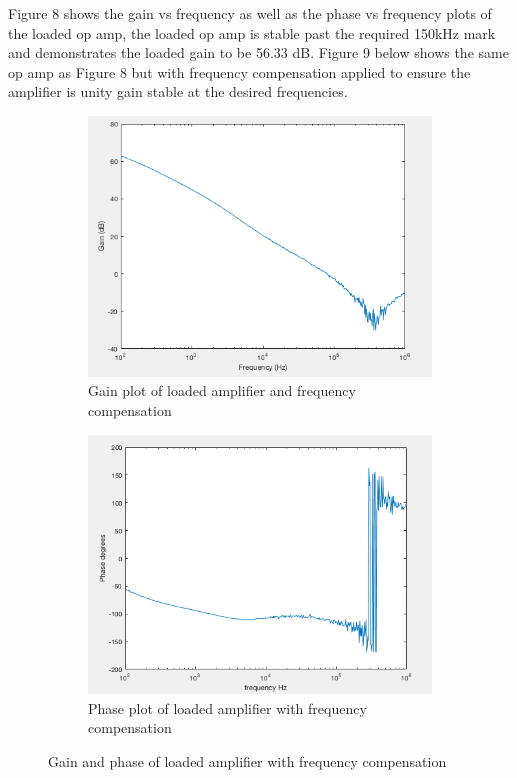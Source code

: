 	Figure 8 shows the gain vs frequency as well as the phase vs frequency plots of the loaded op amp, the loaded op amp is stable past the required 150kHz mark and demonstrates the loaded gain to be 56.33 dB.
	\newpage
	Figure 9 below shows the same op amp as Figure 8 but with frequency compensation applied to ensure the amplifier is unity gain stable at the desired frequencies.
	
		\begin{figure}[H]
		\centering
		\begin{subfigure}[b]{0.45\textwidth}
			\centering
		\includegraphics[scale=.40]{ExperimentalImplementation/gainwithcomp.png}
		\caption{Gain plot of loaded amplifier and frequency compensation}
		\label{fig:gainwithcomp}
		\end{subfigure}
		\hfill
		\begin{subfigure}[b]{0.45\textwidth}
			\centering
			\includegraphics[scale=.40]{ExperimentalImplementation/phasewithcomp.png}
			\caption{Phase plot of loaded amplifier with frequency compensation}
			\label{fig:phasewithcomp}
		\end{subfigure}
		\caption{Gain and phase of loaded amplifier with frequency compensation}
		\label{fig:loadampfreq}
	\end{figure} 
	
